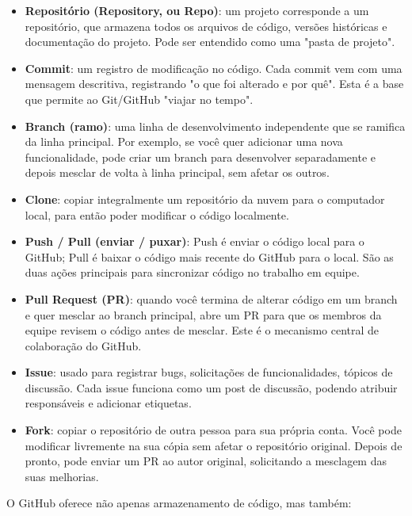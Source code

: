 \begin{itemize}
  \item \textbf{Repositório (Repository, ou Repo)}: um projeto corresponde a um repositório, que armazena todos os arquivos de código, versões históricas e documentação do projeto. Pode ser entendido como uma "pasta de projeto".
  \item \textbf{Commit}: um registro de modificação no código. Cada commit vem com uma mensagem descritiva, registrando "o que foi alterado e por quê". Esta é a base que permite ao Git/GitHub "viajar no tempo".
  \item \textbf{Branch (ramo)}: uma linha de desenvolvimento independente que se ramifica da linha principal. Por exemplo, se você quer adicionar uma nova funcionalidade, pode criar um branch para desenvolver separadamente e depois mesclar de volta à linha principal, sem afetar os outros.
  \item \textbf{Clone}: copiar integralmente um repositório da nuvem para o computador local, para então poder modificar o código localmente.
  \item \textbf{Push / Pull (enviar / puxar)}: Push é enviar o código local para o GitHub; Pull é baixar o código mais recente do GitHub para o local. São as duas ações principais para sincronizar código no trabalho em equipe.
  \item \textbf{Pull Request (PR)}: quando você termina de alterar código em um branch e quer mesclar ao branch principal, abre um PR para que os membros da equipe revisem o código antes de mesclar. Este é o mecanismo central de colaboração do GitHub.
  \item \textbf{Issue}: usado para registrar bugs, solicitações de funcionalidades, tópicos de discussão. Cada issue funciona como um post de discussão, podendo atribuir responsáveis e adicionar etiquetas.
  \item \textbf{Fork}: copiar o repositório de outra pessoa para sua própria conta. Você pode modificar livremente na sua cópia sem afetar o repositório original. Depois de pronto, pode enviar um PR ao autor original, solicitando a mesclagem das suas melhorias.
\end{itemize}


O GitHub oferece não apenas armazenamento de código, mas também:

